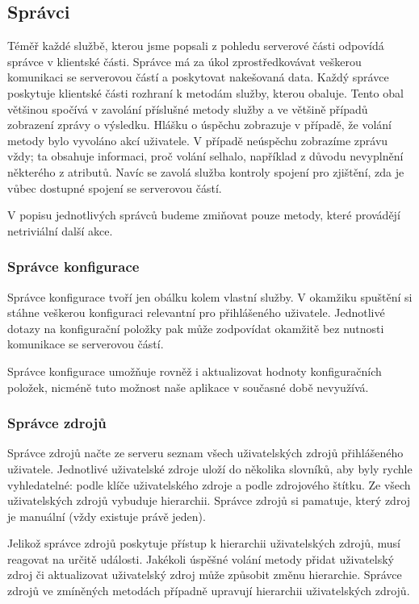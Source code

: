 \subsection{Správci}

Téměř každé službě, kterou jsme popsali z pohledu serverové části odpovídá správce v klientské části.
Správce má za úkol zprostředkovávat veškerou komunikaci se serverovou částí a poskytovat nakešovaná data.
Každý správce poskytuje klientské části rozhraní k metodám služby, kterou obaluje.
Tento obal většinou spočívá v zavolání příslušné metody služby a ve většině případů zobrazení zprávy o výsledku.
Hlášku o úspěchu zobrazuje v případě, že volání metody bylo vyvoláno akcí uživatele.
V případě neúspěchu zobrazíme zprávu vždy; ta obsahuje informaci, proč volání selhalo, například z důvodu nevyplnění některého z atributů.
Navíc se zavolá služba kontroly spojení pro zjištění, zda je vůbec dostupné spojení se serverovou částí.

V popisu jednotlivých správců budeme zmiňovat pouze metody, které provádějí netriviální další akce.

\subsubsection{Správce konfigurace}

Správce konfigurace tvoří jen obálku kolem vlastní služby.
V okamžiku spuštění si stáhne veškerou konfiguraci relevantní pro přihlášeného uživatele.
Jednotlivé dotazy na konfigurační položky pak může zodpovídat okamžitě bez nutnosti komunikace se serverovou částí.

Správce konfigurace umožňuje rovněž i aktualizovat hodnoty konfiguračních položek, nicméně tuto možnost naše aplikace v současné době nevyužívá.

\subsubsection{Správce zdrojů}

Správce zdrojů načte ze serveru seznam všech uživatelských zdrojů přihlášeného uživatele.
Jednotlivé uživatelské zdroje uloží do několika slovníků, aby byly rychle vyhledatelné: podle klíče uživatelského zdroje a podle zdrojového štítku.
Ze všech uživatelských zdrojů vybuduje hierarchii.
Správce zdrojů si pamatuje, který zdroj je manuální (vždy existuje právě jeden).

Jelikož správce zdrojů poskytuje přístup k hierarchii uživatelských zdrojů, musí reagovat na určitě události.
Jakékoli úspěšné volání metody přidat uživatelský zdroj či aktualizovat uživatelský zdroj může způsobit změnu hierarchie.
Správce zdrojů ve zmíněných metodách případně upravují hierarchii uživatelských zdrojů.

